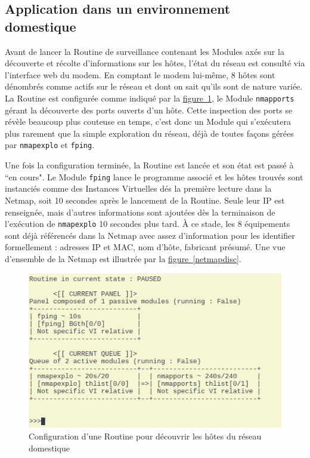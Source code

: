\documentclass[]{article}
\newcommand{\wordlink}[2]{\hyperref[#1]{#2~\ref{#1}}}
\begin{document}
\subsection{Application dans un environnement domestique}

Avant de lancer la Routine de surveillance contenant les Modules axés sur la découverte et récolte d'informations sur les hôtes, l'état du réseau est consulté via l'interface web du modem. En comptant le modem lui-même, 8 hôtes sont dénombrés comme actifs sur le réseau et dont on sait qu'ils sont de nature variée. La Routine est configurée comme indiqué par la \wordlink{routinedisc}{figure}, le Module \texttt{nmapports} gérant la découverte des ports ouverts d'un hôte. Cette inspection des ports se révèle beaucoup plus couteuse en temps, c'est donc un Module qui s'exécutera plus rarement que la simple exploration du réseau, déjà de toutes façons gérées par \texttt{nmapexplo} et \texttt{fping}.\\

\par Une fois la configuration terminée, la Routine est lancée et son état est passé à ``en cours". Le Module \texttt{fping} lance le programme associé et les hôtes trouvés sont instanciés comme des Instances Virtuelles dés la première lecture dans la Netmap, soit 10 secondes après le lancement de la Routine. Seule leur IP est renseignée, mais d'autres informations sont ajoutées dès la terminaison de l'exécution de \texttt{nmapexplo} 10 secondes plus tard. À ce stade, les 8 équipements sont déjà référencés dans la Netmap avec assez d'information pour les identifier formellement : adresses IP et MAC, nom d'hôte, fabricant présumé. Une vue d'ensemble de la Netmap est illustrée par la \wordlink{netmapdisc}{figure}.

\newpage

\begin{figure}[!ht]
\centering
     \includegraphics[width=0.6\linewidth]{routineDisc}
     \caption{Configuration d'une Routine pour découvrir les hôtes du réseau domestique}
     \label{routinedisc}
\end{figure}
\end{document}
